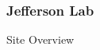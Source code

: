 \begin{frame}
 \frametitle{Jefferson Lab}
 \begin{block}{Site Overview}
  \begin{center}
  \end{center}
 \end{block}
\end{frame}
